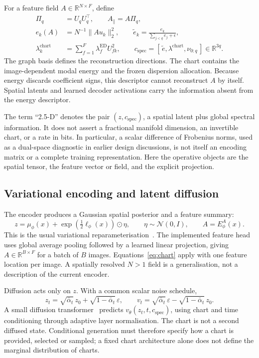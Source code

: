\documentclass[10pt]{article}
\newcommand{\R}{\mathbb{R}}
\newcommand{\Uq}{U_q}
\newcommand{\ed}{\lambda^{\mathrm{ED}}}
\begin{document}
For a feature field $A\in\R^{N\times F}$, define
\begin{align}
 \Pi_q&=\Uq\Uq^\top,\qquad A_\parallel=A\Pi_q,\\
 e_k(A)&=N^{-1}\|Au_k\|_2^2,\qquad
 \widetilde e_k=\frac{e_k}{\sum_{j<q}e_j+\epsilon},\\
 \lambda_k^{\mathrm{chart}}&=\sum_{f=1}^{F}\ed_f U_{fk}^2,\qquad
 c_{\mathrm{spec}}=[\,\widetilde e,\lambda^{\mathrm{chart}},\nu_{0:q}\,]
 \in\R^{3q}.
 \label{eq:chart}
\end{align}
The graph basis defines the reconstruction directions. The chart contains
the image-dependent modal energy and the frozen dispersion allocation.
Because energy discards coefficient signs, this descriptor cannot
reconstruct $A$ by itself. Spatial latents and learned decoder activations
carry the information absent from the energy descriptor.

The term ``2.5-D'' denotes the pair $(z,c_{\mathrm{spec}})$, a spatial
latent plus global spectral information. It does not assert a fractional
manifold dimension, an invertible chart, or a rate in bits. In particular,
a scalar difference of Frobenius norms, used as a dual-space diagnostic in
earlier design discussions, is not itself an encoding matrix or a complete
training representation. Here the operative objects are the spatial
tensor, the feature vector or field, and the explicit projection.

\subsection{Variational encoding and latent diffusion}

The encoder produces a Gaussian spatial posterior and a feature summary:
\begin{equation}
 z=\mu_\phi(x)+\exp\!\left(\tfrac12\ell_\phi(x)\right)\odot\eta,
 \qquad \eta\sim\mathcal N(0,I),\qquad A=E_\phi^A(x).
 \label{eq:vae}
\end{equation}
This is the usual variational reparameterisation~\cite{kingma}.
The implemented feature head uses global average pooling followed by
a learned linear projection, giving $A\in\R^{B\times F}$ for a batch
of $B$ images. Equations~\eqref{eq:chart} apply with one feature location
per image. A spatially resolved $N>1$ field is a generalisation, not a
description of the current encoder.

Diffusion acts only on $z$. With a common scalar noise schedule,
\begin{equation}
 z_t=\sqrt{\bar\alpha_t}\,z_0+
       \sqrt{1-\bar\alpha_t}\,\varepsilon,\qquad
 v_t=\sqrt{\bar\alpha_t}\,\varepsilon-
       \sqrt{1-\bar\alpha_t}\,z_0.
 \label{eq:diffusion}
\end{equation}
A small diffusion transformer~\cite{peebles} predicts
$v_\theta(z_t,t,c_{\mathrm{spec}})$, using chart and time conditioning
through adaptive layer normalisation. The chart is not a second diffused
state. Conditional generation must therefore specify how a chart is
provided, selected or sampled; a fixed chart architecture alone does not
define the marginal distribution of charts.
\end{document}
